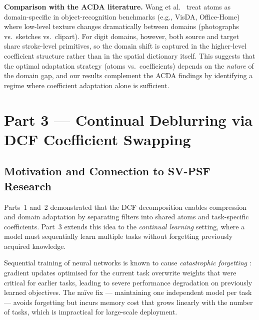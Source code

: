 \documentclass[11pt,letterpaper]{article}
\begin{document}
\textbf{Comparison with the ACDA literature.}
Wang et al.\ \cite{wang2020dictionary} treat atoms as domain-specific in
object-recognition benchmarks (e.g., VisDA, Office-Home) where low-level
texture changes dramatically between domains (photographs vs.\ sketches
vs.\ clipart).  For digit domains, however, both source and target share
stroke-level primitives, so the domain shift is captured in the
higher-level coefficient structure rather than in the spatial dictionary
itself.  This suggests that the optimal adaptation strategy (atoms vs.\
coefficients) depends on the \emph{nature} of the domain gap, and our
results complement the ACDA findings by identifying a regime where
coefficient adaptation alone is sufficient.

\newpage


\section{Part 3 --- Continual Deblurring via DCF Coefficient Swapping}
\label{sec:part3}

\subsection{Motivation and Connection to SV-PSF Research}
\label{sec:p3_motivation}

Parts~1 and~2 demonstrated that the DCF decomposition enables compression
and domain adaptation by separating filters into shared atoms and
task-specific coefficients.  Part~3 extends this idea to the
\emph{continual learning} setting, where a model must sequentially learn
multiple tasks without forgetting previously acquired knowledge.

Sequential training of neural networks is known to cause
\emph{catastrophic forgetting} \cite{french1999catastrophic}: gradient
updates optimised for the current task overwrite weights that were critical
for earlier tasks, leading to severe performance degradation on previously
learned objectives.  The na\"{i}ve fix --- maintaining one independent
model per task --- avoids forgetting but incurs memory cost that grows
linearly with the number of tasks, which is impractical for large-scale
deployment.
\end{document}
